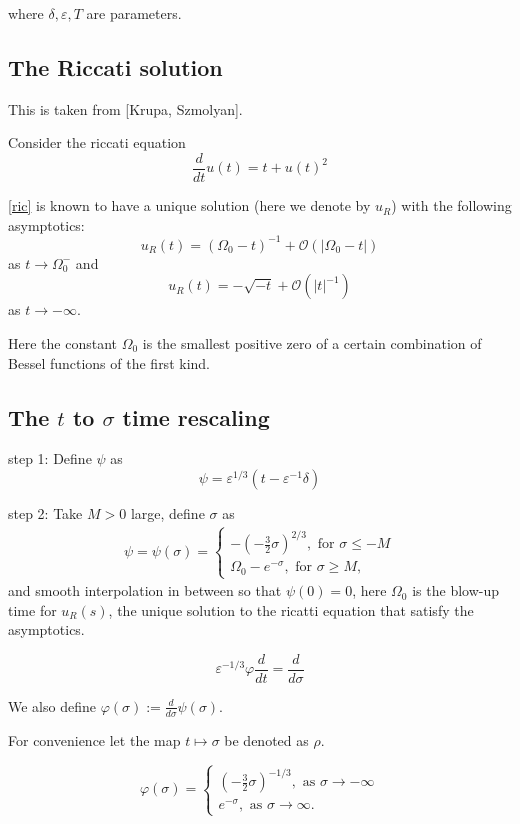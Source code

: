 \documentclass[letterpaper,11pt]{article}
\newcommand{\rmO}{\mathcal{O}}
\newcommand{\eps}{\varepsilon}
\numberwithin{equation}{section}
\theoremstyle{plain}
\begin{document}
where $\delta,\eps, T$ are parameters.

\subsection{The Riccati solution}
This is taken from [Krupa, Szmolyan].

Consider the riccati equation
\begin{equation}\label{ric}
\frac{d}{dt}u(t) = t+u(t)^2
\end{equation}

\eqref{ric} is known to have a unique solution (here we denote by $u_R$) with the following asymptotics:
\[
u_R(t) = (\Omega_0-t)^{-1} + \rmO(|\Omega_0-t|)
\] as $t \to \Omega_0^-$ and
\[
u_R(t) = -\sqrt{-t} + \rmO( |t|^{-1})
\] as $t \to -\infty$.

Here the constant $\Omega_0$ is the smallest positive zero of a certain combination of Bessel functions of the first kind. 

\subsection{The \texorpdfstring{$t$}{t} to \texorpdfstring{$\sigma$}{sigma} time rescaling}

step 1: Define $\psi$ as
\[
\psi = \eps^{1/3}(t - \eps^{-1}\delta)
\]

step 2:
Take $M>0$ large, define $\sigma$ as
\begin{align*}
\psi = \psi(\sigma) =\begin{cases}
-(-\frac{3}{2} \sigma)^{2/3} , \text{ for }\sigma \le -M\\
\Omega_0 -e^{-\sigma}, \text{ for }\sigma \ge M,
\end{cases}
\end{align*}
and smooth interpolation in between so that $\psi(0) = 0$, here $\Omega_0$ is the blow-up time for $u_R(s)$, the unique solution to the ricatti equation that satisfy the asymptotics.

\[
\eps^{-1/3}\varphi \frac{d}{dt} = \frac{d}{d\sigma}
\]

We also define $\varphi(\sigma) := \frac{d}{d\sigma}\psi(\sigma)$.

For convenience let the map $t \mapsto \sigma$ be denoted as $\rho$.

\iffalse
\begin{equation*}
\varphi(\sigma) =\begin{cases}
 (-\frac{3}{2}\sigma)^{-1/3}, \text{ as }\sigma \to -\infty\\
e^{-\sigma} , \text{ as }\sigma \to \infty.
\end{cases}
\end{equation*}
\end{document}
